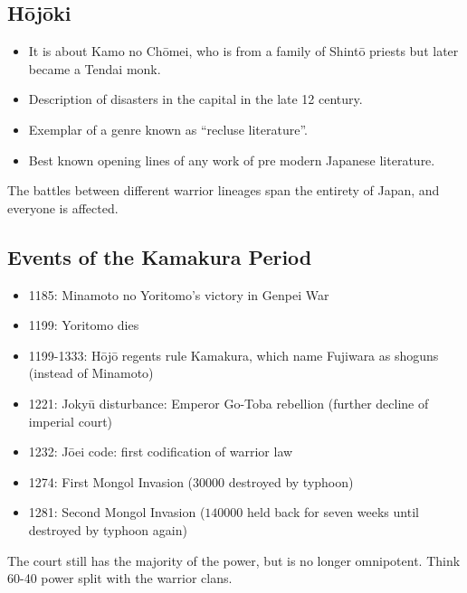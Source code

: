 \documentclass[class=article, crop=false]{standalone}
\begin{document}
  \subsection{H\=oj\=oki}
  \begin{itemize}
    \item It is about Kamo no Ch\=omei, who is from a family of Shint\=o priests but later became a Tendai monk.
    \item Description of disasters in the capital in the late 12 century.
    \item Exemplar of a genre known as ``recluse literature''.
    \item Best known opening lines of any work of pre modern Japanese literature.
  \end{itemize}
  \begin{note}{}
    The battles between different warrior lineages span the entirety of Japan, and everyone is affected.
  \end{note}
  \subsection{Events of the Kamakura Period}
  \begin{itemize}
    \item 1185: Minamoto no Yoritomo's victory in Genpei War
    \item 1199: Yoritomo dies
    \item 1199-1333: H\=oj\=o regents rule Kamakura, which name Fujiwara as shoguns (instead of Minamoto)
    \item 1221: Joky\=u disturbance: Emperor Go-Toba rebellion (further decline of imperial court)
    \item 1232: J\=oei code: first codification of warrior law
    \item 1274: First Mongol Invasion ($30000$ destroyed by typhoon)
    \item 1281: Second Mongol Invasion ($140000$ held back for seven weeks until destroyed by typhoon again)
  \end{itemize}
  \begin{note}{}
    The court still has the majority of the power, but is no longer omnipotent. Think 60-40 power split with the warrior clans.
  \end{note}
\end{document}
